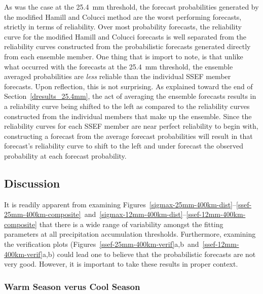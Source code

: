As was the case at the \mbox{25.4 mm} threshold, the forecast probabilities generated by the modified Hamill and Colucci method are the worst performing forecasts, strictly in terms of reliability.
Over most probability forecasts, the reliability curve for the modified Hamill and Colucci forecasts is well separated from the reliability curves constructed from the probabilistic forecasts generated directly from each ensemble member.
One thing that is import to note, is that unlike what occurred with the forecasts at the \mbox{25.4 mm} threshold, the ensemble averaged probabilities are \emph{less} reliable than the individual SSEF member forecasts.
Upon reflection, this is not surprising. As explained toward the end of \mbox{Section \ref{dresults_25.4mm}}, the act of averaging the ensemble forecasts results in a reliability curve being shifted to the left as compared to the reliability curves constructed from the individual members that make up the ensemble.
Since the reliability curves for each SSEF member are near perfect reliability to begin with, constructing a forecast from the average forecast probabilities will result in that forecast's reliability curve to shift to the left and under forecast the observed probability at each forecast probability.




\subsection{Discussion}
\label{ediscussion}

It is readily apparent from examining \mbox{Figures \ref{sigmax-25mm-400km-dist}--\ref{ssef-25mm-400km-composite} and \ref{sigmax-12mm-400km-dist}--\ref{ssef-12mm-400km-composite}} that there is a wide range of variability amongst the fitting parameters at all precipitation accumulation thresholds.
Furthermore, examining the verification plots (\mbox{Figures \ref{ssef-25mm-400km-verif}a,b and \ref{ssef-12mm-400km-verif}a,b}) could lead one to believe that the probabilistic forecasts are not very good.
However, it is important to take these results in proper context.




\subsubsection{Warm Season verus Cool Season}

